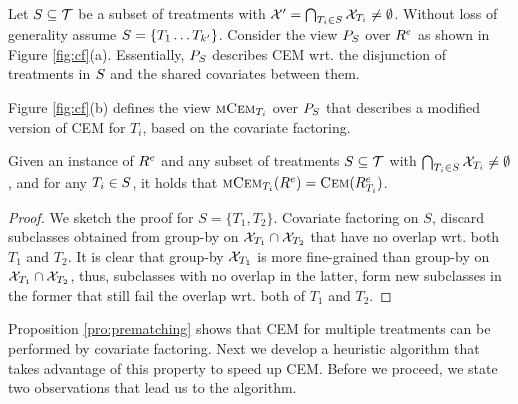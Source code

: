 Let $S \subseteq {{\mathcal{T}}}$ be a subset of treatments
with ${{\mathcal{X}'}}= \bigcap_{T_i \in S} {{\mathcal{X}}}_{T_i} \not = \emptyset$. Without loss of generality assume $S=\{T_1 \ldots T_{k'}\}$.
 Consider the view ${{P}_{S}}$ over ${{R}^e}$ as shown in Figure \ref{fig:cf}(a). Essentially, ${{P}_{S}}$ describes CEM wrt. the disjunction
 of treatments in $S$ and the shared covariates between them.   Figure \ref{fig:cf}(b) defines the view ${\textsc{mCem}_{T_i}}$ over ${{P}_{S}}$ that describes a modified version of CEM for $T_i$,
based on the covariate factoring.  

\vspace{-0.2cm}
\begin{proposition} \label{pro:prematching}
Given an  instance of ${{R}^e}$ and any subset of treatments $S\subseteq {{\mathcal{T}}}$ with
$\bigcap_{T_i \in S} {{\mathcal{X}}}_{T_i} \not = \emptyset$, and for any $T_i \in S$, it holds that ${\textsc{mCem}_{T_i}}({{R}^e})={\textsc{Cem}}({{R}^e_{T_i}})$.
\end{proposition}
\vspace{-0.1cm}

\begin{proof}
  We sketch the proof for $S=\{T_1, T_2\}$. Covariate factoring on $S$, discard subclasses obtained from group-by
  on ${{\mathcal{X}}}_{T_1} \cap {{\mathcal{X}}}_{T_2}$ that have no overlap wrt. both $T_1$ and $T_2$. It is clear that group-by ${{\mathcal{X}}}_{T_1}$ is more fine-grained  than group-by on ${{\mathcal{X}}}_{T_1} \cap {{\mathcal{X}}}_{T_2}$, thus, subclasses with no overlap in the latter, form new subclasses in the former that still fail the overlap wrt. both of $T_1$ and $T_2$.
\end{proof}
Proposition \ref{pro:prematching} shows that CEM for multiple treatments can be performed by covariate factoring.
Next we develop a heuristic algorithm that takes advantage of this property to speed up CEM.
Before we proceed, we  state two observations that lead us to the algorithm.

